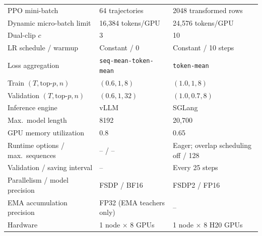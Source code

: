 \begin{table}[!htbp]
\begin{tabularx}{\linewidth}{@{}lXX@{}}
    PPO mini-batch & 64 trajectories & 2048 transformed rows \\
    Dynamic micro-batch limit & 16,384 tokens/GPU & 24,576 tokens/GPU \\
    Dual-clip $c$ & 3 & 10 \\
    LR schedule / warmup & Constant / 0 & Constant / 10 steps \\
    Loss aggregation & \texttt{seq-mean-token-mean} & \texttt{token-mean} \\
    Train $(T,\mathrm{top}\text{-}p,n)$ & $(0.6,1,8)$ & $(1.0,1,8)$ \\
    Validation $(T,\mathrm{top}\text{-}p,n)$ & $(0.6,1,32)$ & $(1.0,0.7,8)$ \\
    Inference engine & vLLM & SGLang \\
    Max.\ model length & 8192 & 20,700 \\
    GPU memory utilization & 0.8 & 0.65 \\
    Runtime options / max.\ sequences & -- / -- & Eager; overlap scheduling off / 128 \\
    Validation / saving interval & -- & Every 25 steps \\
    Parallelism / model precision & FSDP / BF16 & FSDP2 / FP16 \\
    EMA accumulation precision & FP32 (EMA teachers only) & -- \\
    Hardware & 1 node $\times$ 8 GPUs & 1 node $\times$ 8 H20 GPUs \\
    \bottomrule
  \end{tabularx}
\end{table}


